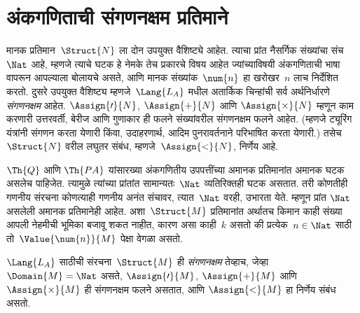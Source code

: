 \section{अंकगणिताची संगणनक्षम प्रतिमाने}\label{mod:mar:cmp:sec}

\begin{explain}
मानक प्रतिमान~$\Struct{N}$ ला दोन उपयुक्त वैशिष्ट्ये आहेत. त्याचा प्रांत
नैसर्गिक संख्यांचा संच~$\Nat$ आहे, म्हणजे त्याचे घटक हे नेमके तेच प्रकारचे
विषय आहेत ज्यांच्याविषयी अंकगणिताची भाषा वापरून आपल्याला बोलायचे असते, आणि
मानक संख्यांक~$\num{n}$ हा खरोखर~$n$ लाच निर्देशित करतो. दुसरे उपयुक्त
वैशिष्ट्य म्हणजे~$\Lang{L_A}$ मधील अतार्किक चिन्हांची सर्व अर्थनिर्धारणे
\emph{संगणनक्षम} आहेत. $\Assign{\prime}{N}$, $\Assign{+}{N}$ आणि
$\Assign{\times}{N}$ म्हणून काम करणारी उत्तरवर्ती, बेरीज आणि गुणाकार ही
फलने संख्यांवरील संगणनक्षम फलने आहेत. (म्हणजे ट्यूरिंग यंत्रांनी संगणन करता
येणारी किंवा, उदाहरणार्थ, आदिम पुनरावर्तनाने परिभाषित करता येणारी.) तसेच
$\Struct{N}$ वरील लघुतर संबंध, म्हणजे~$\Assign{<}{N}$, निर्णेय आहे.

$\Th{Q}$ आणि $\Th{PA}$ यांसारख्या अंकगणितीय उपपत्तींच्या अमानक प्रतिमानांत
अमानक घटक असलेच पाहिजेत. त्यामुळे त्यांच्या प्रांतांत सामान्यतः~$\Nat$
व्यतिरिक्तही घटक असतात. तरी कोणतीही गणनीय संरचना कोणत्याही
गणनीय अनंत संचावर, त्यात~$\Nat$ वरही, उभारता येते. म्हणून प्रांत
$\Nat$ असलेली अमानक प्रतिमानेही आहेत. अशा~$\Struct{M}$ प्रतिमानांत अर्थातच
किमान काही संख्या आपली नेहमीची भूमिका बजावू शकत नाहीत, कारण असा काही~$k$
असतो की प्रत्येक~$n \in \Nat$ साठी तो~$\Value{\num{n}}{M}$ पेक्षा
वेगळा असतो.
\end{explain}

\begin{defn}
$\Lang{L_A}$ साठीची संरचना~$\Struct{M}$ ही \emph{संगणनक्षम}
तेव्हाच, जेव्हा $\Domain{M} = \Nat$ असते, $\Assign{\prime}{M}$,
$\Assign{+}{M}$ आणि $\Assign{\times}{M}$ ही संगणनक्षम फलने असतात, आणि
$\Assign{<}{M}$ हा निर्णेय संबंध असतो.
\end{defn}

